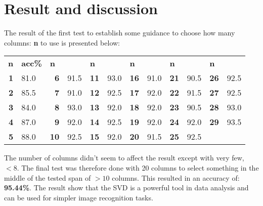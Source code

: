 \documentclass[a4paper]{article}
\begin{document}
\section*{Result and discussion}
The result of the first test to establish some guidance to choose how many columns: \textbf{n}  to use is presented below:

\begin{table}[ht]
\begin{tabular}{rlrlrlrlrlrl}
\multicolumn{1}{l}{\textbf{n}} & \textbf{acc\%} & \multicolumn{1}{l}{\textbf{n}} & \textbf{} & \multicolumn{1}{l}{\textbf{n}} & \textbf{} & \multicolumn{1}{l}{\textbf{n}} & \textbf{} & \multicolumn{1}{l}{\textbf{n}} & \textbf{} & \multicolumn{1}{l}{\textbf{n}} & \textbf{} \\
\textbf{1}                     & 81.0           & \textbf{6}                     & 91.5      & \textbf{11}                    & 93.0      & \textbf{16}                    & 91.0      & \textbf{21}                    & 90.5      & \textbf{26}                    & 92.5      \\
\textbf{2}                     & 85.5           & \textbf{7}                     & 91.0      & \textbf{12}                    & 92.5      & \textbf{17}                    & 92.0      & \textbf{22}                    & 91.5      & \textbf{27}                    & 92.5      \\
\textbf{3}                     & 84.0           & \textbf{8}                     & 93.0      & \textbf{13}                    & 92.0      & \textbf{18}                    & 92.0      & \textbf{23}                    & 90.5      & \textbf{28}                    & 93.0      \\
\textbf{4}                     & 87.0           & \textbf{9}                     & 92.0      & \textbf{14}                    & 92.5      & \textbf{19}                    & 92.0      & \textbf{24}                    & 92.0      & \textbf{29}                    & 93.5      \\
\textbf{5}                     & 88.0           & \textbf{10}                    & 92.5      & \textbf{15}                    & 92.0      & \textbf{20}                    & 91.5      & \textbf{25}                    & 92.5      & \multicolumn{1}{l}{}           &          
\end{tabular}
\end{table}

The number of columns didn't seem to affect the result except with very few, $<8$. The final test was therefore done with 20 columns to select something in the middle of the tested span of $>10$ columns. This resulted in an accuracy of: \textbf{95.44\%}. The result show that the SVD is a powerful tool in data analysis and can be used for simpler image recognition tasks.  



\end{document}
